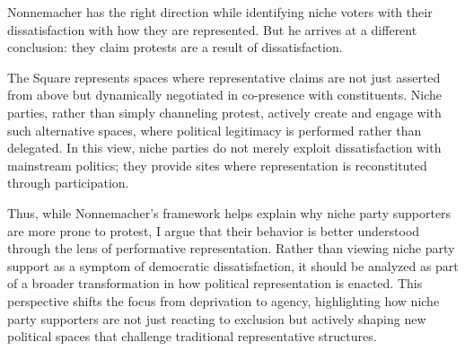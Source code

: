 Nonnemacher has the right direction while identifying niche voters with their dissatisfaction with how they are represented. But he arrives at a different conclusion: they claim protests are a result of dissatisfaction.

The Square represents spaces where representative claims are not just asserted from above but dynamically negotiated in co-presence with constituents. Niche parties, rather than simply channeling protest, actively create and engage with such alternative spaces, where political legitimacy is performed rather than delegated. In this view, niche parties do not merely exploit dissatisfaction with mainstream politics; they provide sites where representation is reconstituted through participation.

Thus, while Nonnemacher’s framework helps explain why niche party supporters are more prone to protest, I argue that their behavior is better understood through the lens of performative representation. Rather than viewing niche party support as a symptom of democratic dissatisfaction, it should be analyzed as part of a broader transformation in how political representation is enacted. This perspective shifts the focus from deprivation to agency, highlighting how niche party supporters are not just reacting to exclusion but actively shaping new political spaces that challenge traditional representative structures.

